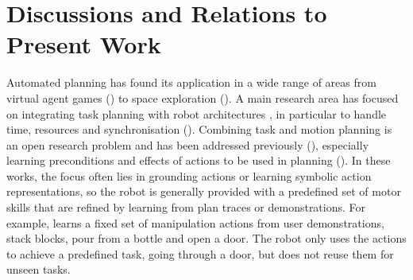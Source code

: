 \section{Discussions and Relations to Present Work}
Automated planning has found its application in a wide range of areas from virtual agent games (\cite{fernandez2006planning}) to space exploration (\cite{backes2004multi,bresina2005activity}).
A main research area has focused on integrating task planning with robot architectures \cite{cashmore2015rosplan}, in particular to handle time, resources and synchronisation (\cite{di2014planner,dvorak2014flexible}).
Combining task and motion planning is an open research problem and has been addressed previously (\cite{ferrer2015planning,garrett2015ffrob}), especially learning preconditions and effects of actions to be used in planning (\cite{ahmadzadeh2015learning,jetchev2013learning,konidaris2018fromSkills,ugur2015bottom}).
In these works, the focus often lies in grounding actions or learning symbolic action representations, so the robot is generally provided with a predefined set of motor skills that are refined by learning from plan traces or demonstrations.
For example, \citet{abdo2013learning} learns a fixed set of manipulation actions from user demonstrations, \ie stack blocks, pour from a bottle and open a door.
The robot only uses the actions to achieve a predefined task, \eg going through a door, but does not reuse them for unseen tasks.

